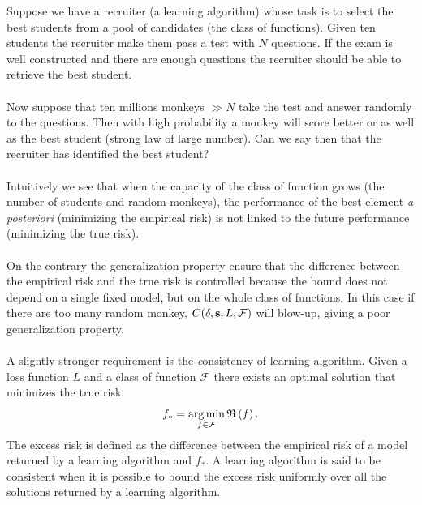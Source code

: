 \begin{example}
    Suppose we have a recruiter (a learning algorithm) whose task is to select 
    the best students from a pool of candidates (the class of functions).
    Given ten students the recruiter make them pass a test with $N$ questions.
    If the exam is well constructed and there are enough questions the
    recruiter should be able to retrieve the best student.
    \paragraph{}
    Now suppose that ten millions monkeys $\gg N$ take the test and answer
    randomly to the questions. Then with high probability a monkey will score
    better or as well as the best student (strong law of large number). Can we
    say then that the recruiter has identified the best
    student?
    \paragraph{}
    Intuitively we see that when the capacity of the class of function grows
    (the number of students and random monkeys), the performance of the best
    element \emph{a posteriori} (minimizing the empirical risk) is not linked
    to the future performance (minimizing the true risk).
    \paragraph{}
    On the contrary the generalization property ensure that the difference
    between the empirical risk and the true risk is controlled because the bound
    does not depend on a single fixed model, but on the whole class of
    functions. In this case if there are too many random monkey, $C(\delta,
    \boldsymbol{\mathbf{s}}, L, \mathcal{F})$ will blow-up, giving a poor generalization
    property.
\end{example}
\paragraph{}
A slightly stronger requirement is the {\emph consistency} of learning algorithm.
Given a loss function $L$ and a class of function $\mathcal{F}$ there exists an
optimal solution that minimizes the true risk.
\begin{dmath*}
    f_* = \argmin_{f\in\mathcal{F}} \risk{f}.
\end{dmath*}
The excess risk is defined as the difference between the empirical risk of a
model returned by a learning algorithm and $f_*$. A learning algorithm is said to be
consistent when it is possible to bound the excess risk uniformly over all
the solutions returned by a learning algorithm. 

